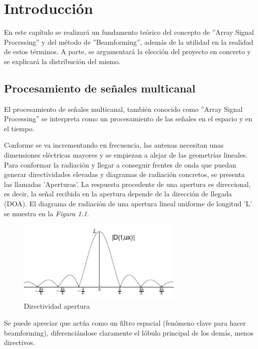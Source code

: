 \documentclass[a4paper,11pt]{book}
\begin{document}


\frontmatter
\tableofcontents
%
\mainmatter
\setlength{\parskip}{5pt}

\chapter{Introducción}
En este capítulo se realizará un fundamento teórico del concepto de ''Array Signal Processing'' y del método de ''Beamforming'', además de la utilidad en la realidad de estos términos. A parte, se argumentará la elección del proyecto en concreto y se explicará la distribución del mismo.
	\section{Procesamiento de señales multicanal}
	El procesamiento de señales multicanal, también conocido como ''Array Signal Processing'' se interpreta como un procesamiento de las señales en el espacio y en el tiempo.
	
	Conforme se va incrementando en frecuencia, las antenas necesitan unas dimensiones eléctricas mayores y se empiezan a alejar de las geometrías lineales. Para conformar la radiación y llegar a conseguir frentes de onda que puedan generar directividades elevadas y diagramas de radiación concretos, se presenta las llamadas 'Aperturas'. La respuesta procedente de una apertura es direccional, es decir, la señal recibida en la apertura depende de la dirección de llegada (DOA). El diagrama de radiación de una apertura lineal uniforme de longitud 'L' se muestra en la \textit{Figura 1.1}.
	\begin{figure}[hbtp]
	\centering
	\includegraphics[width = 8cm]{FIGURAS/directividad_apertura.JPG}
	\caption{Directividad apertura}
	\end{figure}
	
	 Se puede apreciar que actúa como un filtro espacial (fenómeno clave para hacer beamforming), diferenciándose claramente el lóbulo principal de los demás, menos directivos.
	 
\end{document}
